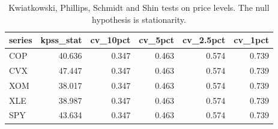 \begin{table}[ht]
\centering
\caption{Kwiatkowski, Phillips, Schmidt and Shin tests on price levels. The null hypothesis is stationarity.} 
\label{tab:kpss_levels}
\begin{tabular}{lrrrrr}
  \toprule
series & kpss\_stat & cv\_10pct & cv\_5pct & cv\_2.5pct & cv\_1pct \\ 
  \midrule
COP & 40.636 & 0.347 & 0.463 & 0.574 & 0.739 \\ 
  CVX & 47.447 & 0.347 & 0.463 & 0.574 & 0.739 \\ 
  XOM & 38.017 & 0.347 & 0.463 & 0.574 & 0.739 \\ 
  XLE & 38.987 & 0.347 & 0.463 & 0.574 & 0.739 \\ 
  SPY & 43.634 & 0.347 & 0.463 & 0.574 & 0.739 \\ 
   \bottomrule
\end{tabular}
\end{table}
